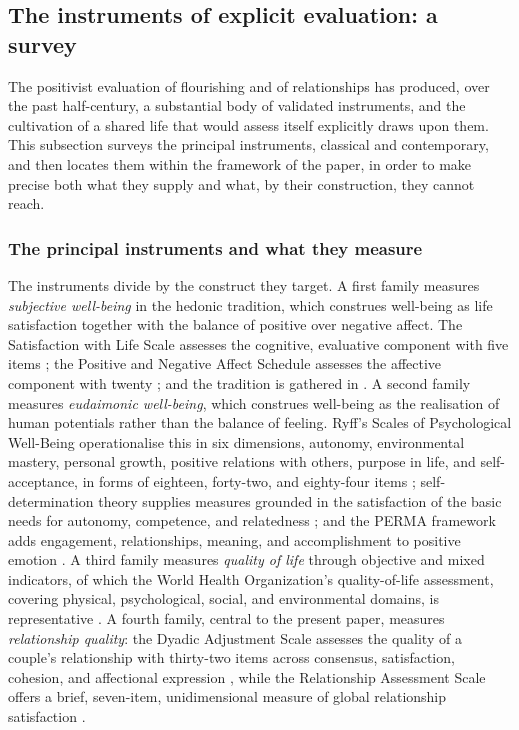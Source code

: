 \subsection{The instruments of explicit evaluation: a survey}
\label{p11:sec:ev-instruments}

The positivist evaluation of flourishing and of relationships has produced, over the past half-century, a substantial body of validated instruments, and the cultivation of a shared life that would assess itself explicitly draws upon them. This subsection surveys the principal instruments, classical and contemporary, and then locates them within the framework of the paper, in order to make precise both what they supply and what, by their construction, they cannot reach.

\subsubsection{The principal instruments and what they measure}
\label{p11:sec:ev-instr-survey}

The instruments divide by the construct they target. A first family measures \emph{subjective well-being} in the hedonic tradition, which construes well-being as life satisfaction together with the balance of positive over negative affect. The Satisfaction with Life Scale assesses the cognitive, evaluative component with five items \parencite{diener1985}; the Positive and Negative Affect Schedule assesses the affective component with twenty \parencite{watson1988}; and the tradition is gathered in \textcite{kahneman1999}. A second family measures \emph{eudaimonic well-being}, which construes well-being as the realisation of human potentials rather than the balance of feeling. Ryff's Scales of Psychological Well-Being operationalise this in six dimensions, autonomy, environmental mastery, personal growth, positive relations with others, purpose in life, and self-acceptance, in forms of eighteen, forty-two, and eighty-four items \parencite{ryff1989,ryffkeyes1995}; self-determination theory supplies measures grounded in the satisfaction of the basic needs for autonomy, competence, and relatedness \parencite{ryan2000,deci1985sdt}; and the PERMA framework adds engagement, relationships, meaning, and accomplishment to positive emotion \parencite{seligman2011}. A third family measures \emph{quality of life} through objective and mixed indicators, of which the World Health Organization's quality-of-life assessment, covering physical, psychological, social, and environmental domains, is representative \parencite{whoqol1998}. A fourth family, central to the present paper, measures \emph{relationship quality}: the Dyadic Adjustment Scale assesses the quality of a couple's relationship with thirty-two items across consensus, satisfaction, cohesion, and affectional expression \parencite{spanier1976}, while the Relationship Assessment Scale offers a brief, seven-item, unidimensional measure of global relationship satisfaction \parencite{hendrick1988}.

